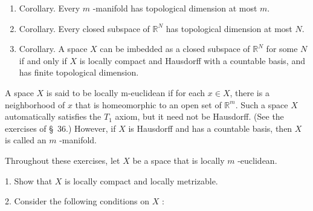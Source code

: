 \begin{enumerate}[itemsep=0.4em, parsep=0pt, topsep=0pt, partopsep=0pt, leftmargin=*, label=\arabic*., ref=\arabic*]
\begin{enumerate}[itemsep=0.2em, parsep=0pt, topsep=0pt, partopsep=0pt, leftmargin=*, label=(\alph*), align=left]
 \item Suppose \(n \geq 0\) and \(\mathcal{B}_{n}\) is an open covering of \(X\) refining \(\mathcal{B}_{0}\) such that \(\mathcal{B}_{n}\) has order at most \(m + 1\) at points of \(X_{n}\). Choose an open covering \(\mathcal{C}\) of \(X\) refining \(\mathcal{B}_{n}\) that has order at most \(m + 1\) at points of \(X_{n + 1}\). Choose \(f : \mathcal{C} \rightarrow {\mathcal{B}}_{n}\) so that \(C \subset f( C)\). For \(B \in {\mathcal{B}}_{n}\), let \(D( B)\) be the union of those \(C\) for which \(f( C) = B\). Let \(\mathcal{B}_{n + 1}\) consist of all sets \(B \in {\mathcal{B}}_{n}\) for which \(B \cap {X}_{n - 1} \neq \varnothing\), along with all sets \(D( B)\) for which \(B \in {\mathcal{B}}_{n}\) and \(B \cap {X}_{n - 1} = \varnothing\). Show that \(\mathcal{B}_{n + 1}\) is an open covering of \(X\) that refines \(\mathcal{B}_{n}\) and has order at most \(m + 1\) at points of \(X_{n + 1}\).
 \item Define \(\mathcal{B}\) as follows: Given a set \(B\), it belongs to \(\mathcal{B}\) if there is an \(N\) such that \(B \in {\mathcal{B}}_{n}\) for all \(n \geq N\).
 \end{enumerate}
\item Corollary. Every \(m\) -manifold has topological dimension at most \(m\).
\item Corollary. Every closed subspace of \(\mathbb{R}^{N}\) has topological dimension at most \(N\).
\item Corollary. A space \(X\) can be imbedded as a closed subspace of \(\mathbb{R}^{N}\) for some \(N\) if and only if \(X\) is locally compact and Hausdorff with a countable basis, and has finite topological dimension. 
\end{enumerate}

A space \(X\) is said to be locally m-euclidean if for each \(x \in X\), there is a neighborhood of \(x\) that is homeomorphic to an open set of \(\mathbb{R}^{m}\). Such a space \(X\) automatically satisfies the \(T_{1}\) axiom, but it need not be Hausdorff. (See the exercises of \S\ 36.) However, if \(X\) is Hausdorff and has a countable basis, then \(X\) is called an \(m\) -manifold.

Throughout these exercises, let \(X\) be a space that is locally \(m\) -euclidean.

1. Show that \(X\) is locally compact and locally metrizable.

2. Consider the following conditions on \(X\) :


